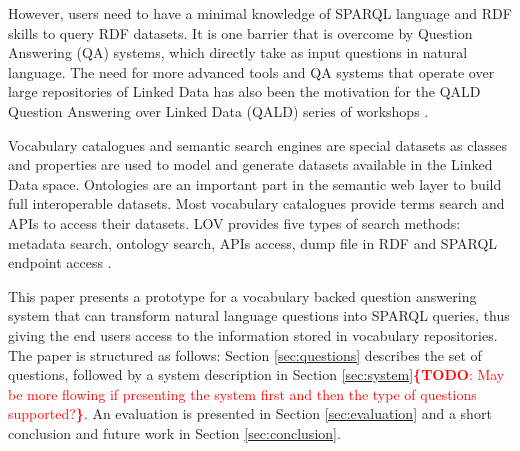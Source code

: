 \documentclass[runningheads,a4paper]{llncs}
\newcommand{\todo}[1]{\noindent\textcolor{red}{{\bf \{TODO}: #1{\bf \}}}}
\begin{document}
However, users need to have a minimal knowledge of SPARQL language and RDF skills to query  RDF datasets. It is one barrier that is overcome by Question Answering (QA) systems, which directly take as input questions in natural language. The need for more advanced tools and QA systems that operate over large repositories of Linked Data has also been the motivation for the QALD Question Answering over Linked Data (QALD) series of workshops \cite{lopezetal2013}. 
 
Vocabulary catalogues and semantic search engines are special datasets as classes and properties are used to model and generate datasets available in the Linked Data space. Ontologies are an important part in the semantic web layer to build full interoperable datasets. Most vocabulary catalogues provide terms search and APIs to access their datasets. LOV provides five types of search methods: metadata search, ontology search, APIs access, dump file in RDF and SPARQL endpoint access \cite{vandenbusschelov}.


 	 

This paper presents a prototype for a vocabulary backed question answering system that can transform natural language questions into SPARQL queries, thus giving the end users access to the information stored in vocabulary repositories. The paper is structured as follows: Section \ref{sec:questions} describes the set of questions, followed by a system description in Section \ref{sec:system}\todo{May be more flowing if presenting the system first and then the type of questions supported?}. An evaluation is presented in Section \ref{sec:evaluation} and a short conclusion and future work in Section \ref{sec:conclusion}.  
\end{document}
